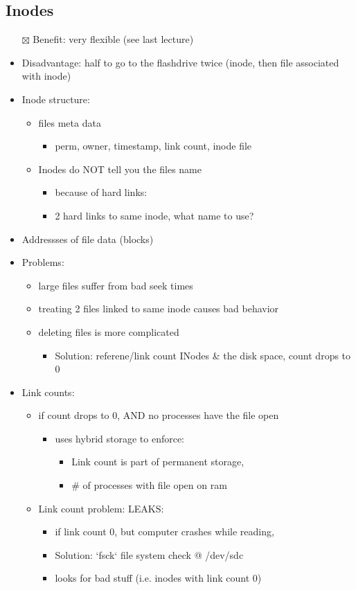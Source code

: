 \documentclass[11pt]{article}
\begin{document}
\subsection{Inodes}
\label{sec:org0a403c8}
\begin{itemize}
\item[{$\boxtimes$}] Benefit: very flexible (see last lecture)
\item Disadvantage: half to go to the flashdrive twice (inode, then file associated with inode)
\item Inode structure:
\begin{itemize}
\item files meta data
\begin{itemize}
\item perm, owner, timestamp, link count, inode file
\end{itemize}
\item Inodes do NOT tell you the files name
\begin{itemize}
\item because of hard links:
\item 2 hard links to same inode, what name to use?
\end{itemize}
\end{itemize}
\item Addressses of file data (blocks)
\item Problems:
\begin{itemize}
\item large files suffer from bad seek times
\item treating 2 files linked to same inode causes bad behavior
\item deleting files is more complicated
\begin{itemize}
\item Solution: referene/link count INodes \& the disk space, count drops to 0
\end{itemize}
\end{itemize}
\item Link counts:
\begin{itemize}
\item if count drops to 0, AND no processes have the file open
\begin{itemize}
\item uses hybrid storage to enforce:
\begin{itemize}
\item Link count is part of permanent storage,
\item \# of processes with file open on ram
\end{itemize}
\end{itemize}
\item Link count problem: LEAKS:
\begin{itemize}
\item if link count 0, but computer crashes while reading,
\item Solution: `fsck` file system check @ /dev/sdc
\item looks for bad stuff (i.e. inodes with link count 0)
\end{itemize}
\end{itemize}
\end{itemize}
\end{document}
